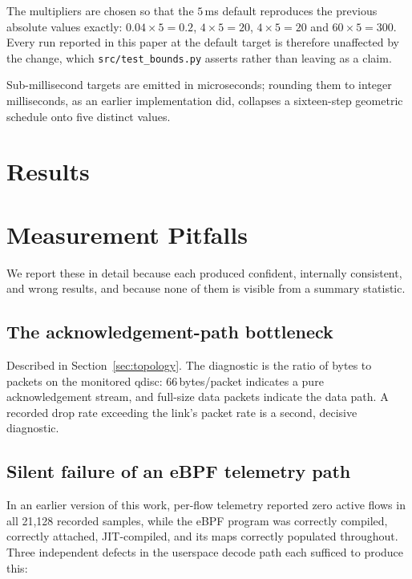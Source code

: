 \documentclass[conference]{IEEEtran}
\begin{document}
The multipliers are chosen so that the $5$\,ms default reproduces the previous
absolute values exactly: $0.04 \times 5 = 0.2$, $4 \times 5 = 20$,
$4 \times 5 = 20$ and $60 \times 5 = 300$. Every run reported in this paper at
the default target is therefore unaffected by the change, which
\texttt{src/test\_bounds.py} asserts rather than leaving as a claim.

Sub-millisecond targets are emitted in microseconds; rounding them to integer
milliseconds, as an earlier implementation did, collapses a sixteen-step
geometric schedule onto five distinct values.

\section{Results}
\label{sec:results}







\section{Measurement Pitfalls}
\label{sec:pitfalls}

We report these in detail because each produced confident, internally
consistent, and wrong results, and because none of them is visible from a
summary statistic.

\subsection{The acknowledgement-path bottleneck}

Described in Section~\ref{sec:topology}. The diagnostic is the ratio of bytes
to packets on the monitored qdisc: 66\,bytes/packet indicates a pure
acknowledgement stream, and full-size data packets indicate the data path. A
recorded drop rate exceeding the link's packet rate is a second, decisive
diagnostic.

\subsection{Silent failure of an eBPF telemetry path}

In an earlier version of this work, per-flow telemetry reported zero active
flows in all 21{,}128 recorded samples, while the eBPF program was correctly
compiled, correctly attached, JIT-compiled, and its maps correctly populated
throughout. Three independent defects in the userspace decode path each
sufficed to produce this:
\end{document}
